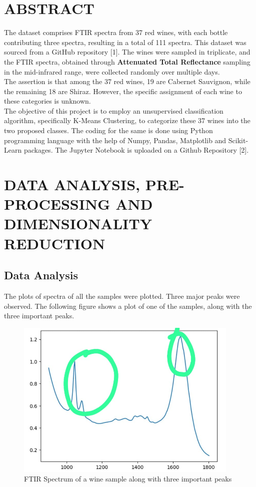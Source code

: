 \documentclass{article}
\begin{document}
\section{ABSTRACT}\label{sec:abstract}
The dataset comprises FTIR spectra from 37 red wines, with each bottle contributing three spectra, resulting in a total of 111 spectra. This dataset was sourced from a GitHub repository [1]. The wines were sampled in triplicate, and the FTIR spectra, obtained through \textbf{Attenuated Total Reflectance} sampling in the mid-infrared range, were collected randomly over multiple days.\\
\newline
The assertion is that among the 37 red wines, 19 are Cabernet Sauvignon, while the remaining 18 are Shiraz. However, the specific assignment of each wine to these categories is unknown.\\
\newline
The objective of this project is to employ an unsupervised classification algorithm, specifically K-Means Clustering, to categorize these 37 wines into the two proposed classes. The coding for the same is done using Python programming language with the help of Numpy, Pandas, Matplotlib and Scikit-Learn packages. The Jupyter Notebook is uploaded on a Github Repository [2].\\


\newpage

\section{DATA ANALYSIS, PRE-PROCESSING AND DIMENSIONALITY REDUCTION}
\subsection{Data Analysis}
The plots of spectra of all the samples were plotted. Three major peaks were observed. The following figure shows a plot of one of the samples, along with the three important peaks.

\begin{figure}[H]
	\centering 
	\includegraphics[height = 3in]{Three important peaks.jpeg}
	\caption[Optional Caption]{FTIR Spectrum of a wine sample along with three important peaks}
	\label{fig:fig1}
\end{figure}
\end{document}
